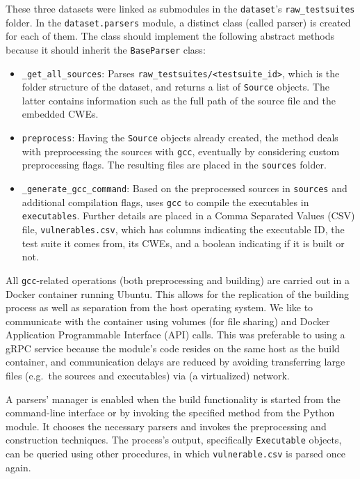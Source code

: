 \documentclass[../main.tex]{subfiles}
\begin{document}
These three datasets were linked as submodules in the \texttt{dataset}'s \cite{dataset_module_repo} \texttt{raw\_testsuites} folder. In the
\texttt{dataset.parsers} module, a distinct class (called parser) is
created for each of them. The class should implement the following
abstract methods because it should inherit the \texttt{BaseParser}
class:

\begin{itemize}
\tightlist
\item
  \texttt{\_get\_all\_sources}: Parses \texttt{raw\_testsuites/\textless{}testsuite\_id\textgreater{}}, which is the folder structure of the
  dataset, and returns a list of \texttt{Source} objects. The latter contains
  information such as the full path of the source file and the embedded
  CWEs.
\item
  \texttt{preprocess}: Having the \texttt{Source} objects already
  created, the method deals with preprocessing the sources with
  \texttt{gcc}, eventually by considering custom preprocessing flags.
  The resulting files are placed in the \texttt{sources} folder.
\item
  \texttt{\_generate\_gcc\_command}: Based on the preprocessed sources
  in \texttt{sources} and additional compilation flags, uses
  \texttt{gcc} to compile the executables in \texttt{executables}.
  Further details are placed in a Comma Separated Values (CSV) file, \texttt{vulnerables.csv},
  which has columns indicating the executable ID, the test suite it
  comes from, its CWEs, and a boolean indicating if it is built or not.
\end{itemize}

All \texttt{gcc}-related operations (both preprocessing and building)
are carried out in a Docker container running Ubuntu. This allows for
the replication of the building process as well as separation from the
host operating system. We like to communicate with the container using
volumes (for file sharing) and Docker Application Programmable Interface (API) calls. This was preferable to
using a gRPC service because the module's code resides on the same host
as the build container, and communication delays are reduced by avoiding
transferring large files (e.g.~the sources and executables) via (a
virtualized) network.

A parsers' manager is enabled when the build functionality is started
from the command-line interface or by invoking the specified method from
the Python module. It chooses the necessary parsers and invokes the
preprocessing and construction techniques. The process's output,
specifically \texttt{Executable} objects, can be queried using other
procedures, in which \texttt{vulnerable.csv} is parsed once again.
\end{document}
